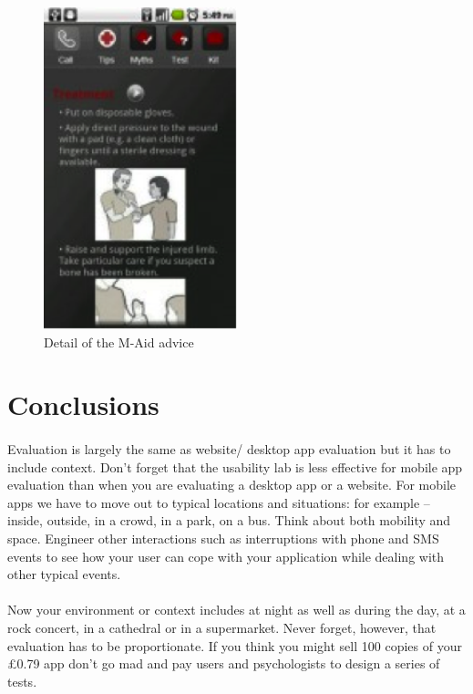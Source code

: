 \documentclass[12pt, a4paper, twoside]{book}
\begin{document}
\begin{figure}[H]
\centering
\includegraphics[width=0.5\textwidth]{images/m-aid-2}
\caption{Detail of the M-Aid advice}
\label{fig:m-aid-2}
\end{figure}

\section{Conclusions}
\paragraph{} Evaluation is largely the same as website/ desktop app evaluation but it has to include context. Don’t forget that the usability lab is less effective for mobile app evaluation than when you are evaluating a desktop app or a website. For mobile apps we have to move out to typical locations and situations: for example – inside, outside, in a crowd, in a park, on a bus. Think about both mobility and space. Engineer other interactions such as interruptions with phone and SMS events to see how your user can cope with your application while dealing with other typical events.

\paragraph{} Now your environment or context includes at night as well as during the day, at a rock concert, in a cathedral or in a supermarket. Never forget, however, that evaluation has to be proportionate. If you think you might sell 100 copies of your £0.79 app don’t go mad and pay users and psychologists to design a series of tests.
\end{document}

